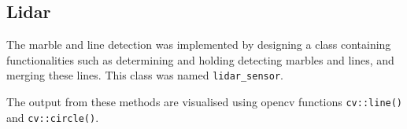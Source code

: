 \documentclass[../Head/Main.tex]{subfiles}
\begin{document}
\subsection{Lidar}
The marble and line detection was implemented by designing a class containing functionalities such as determining and holding detecting marbles and lines, and merging these lines. This class was named \texttt{lidar\_sensor}. 

The output from these methods are visualised using opencv functions \texttt{cv::line()} and \texttt{cv::circle()}.
\end{document}

